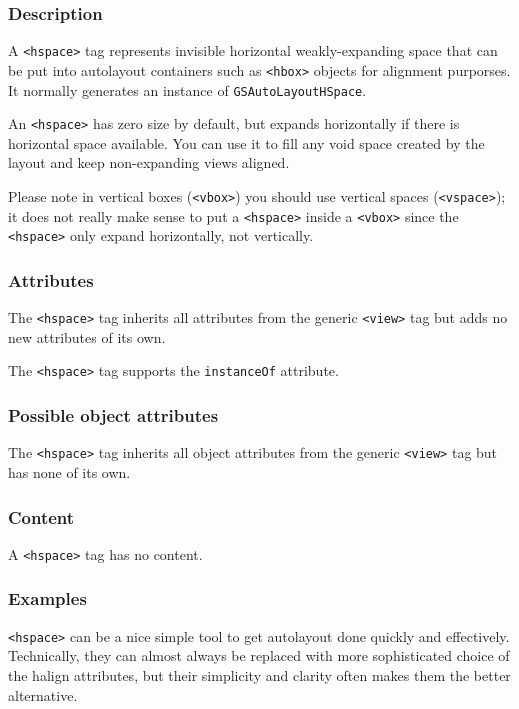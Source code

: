 \subsubsection{Description}

A \texttt{<hspace>} tag represents invisible horizontal
weakly-expanding space that can be put into autolayout containers such
as \texttt{<hbox>} objects for alignment purporses.  It normally
generates an instance of \texttt{GSAutoLayoutHSpace}.

An \texttt{<hspace>} has zero size by default, but expands
horizontally if there is horizontal space available.  You can use it
to fill any void space created by the layout and keep non-expanding
views aligned.

Please note in vertical boxes (\texttt{<vbox>}) you should use
vertical spaces (\texttt{<vspace>}); it does not really make sense to
put a \texttt{<hspace>} inside a \texttt{<vbox>} since the
\texttt{<hspace>} only expand horizontally, not vertically.

\subsubsection{Attributes}
The \texttt{<hspace>} tag inherits all attributes from the generic
\texttt{<view>} tag but adds no new attributes of its own.

The \texttt{<hspace>} tag supports the \texttt{instanceOf} attribute.

\subsubsection{Possible object attributes}
The \texttt{<hspace>} tag inherits all object attributes from the
generic \texttt{<view>} tag but has none of its own.

\subsubsection{Content}
A \texttt{<hspace>} tag has no content.

\subsubsection{Examples}
\texttt{<hspace>} can be a nice simple tool to get autolayout done
quickly and effectively.  Technically, they can almost always be
replaced with more sophisticated choice of the halign attributes, but
their simplicity and clarity often makes them the better alternative.

